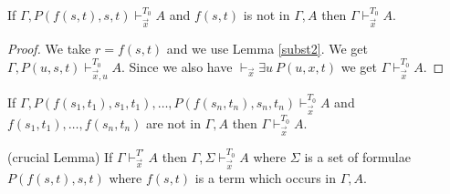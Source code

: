 \documentclass[10pt,a4paper]{article}
\begin{document}

\begin{lemma}\label{simpl}
If $\Gamma,P(f(s,t),s,t)\vdash_{\vec{x}}^{T_0} A$ and
$f(s,t)$ is not in $\Gamma,A$ then $\Gamma\vdash_{\vec{x}}^{T_0} A$.
\end{lemma}

\begin{proof}
We take $r = f(s,t)$ and we use Lemma \ref{subst2}. We get
$\Gamma,P(u,s,t)\vdash_{\vec{x},u}^{T_0} A$. Since we also have
$\vdash_{\vec{x}}\exists u~P(u,x,t)$ we get  $\Gamma\vdash_{\vec{x}}^{T_0} A$.
\end{proof}

\begin{corollary}\label{simpl1}
If $\Gamma,P(f(s_1,t_1),s_1,t_1),\dots,P(f(s_n,t_n),s_n,t_n)\vdash_{\vec{x}}^{T_0} A$ and
$f(s_1,t_1),\dots,f(s_n,t_n)$ are not in $\Gamma,A$ then $\Gamma\vdash_{\vec{x}}^{T_0} A$.
\end{corollary}


\begin{lemma} \label{crucial} (crucial Lemma) 
If $\Gamma\vdash_{\vec{x}}^{T'} A$ then $\Gamma,\Sigma\vdash_{\vec{x}}^{T_0} A$ where
$\Sigma$ is a set of formulae $P(f(s,t),s,t)$ where $f(s,t)$ is a term which
occurs in $\Gamma,A$.
\end{lemma}
\end{document}

